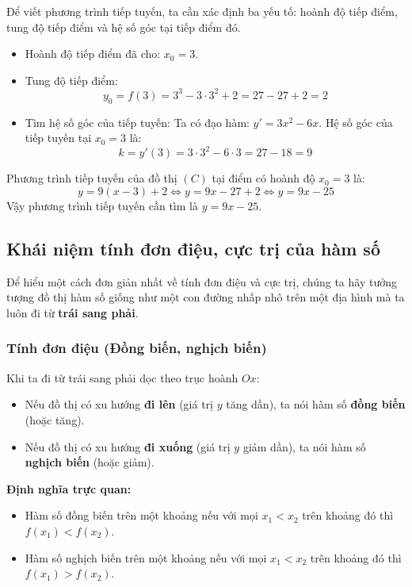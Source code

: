 \documentclass[12pt]{article}
\begin{document}
	\begin{loigiai}
		Để viết phương trình tiếp tuyến, ta cần xác định ba yếu tố: hoành độ tiếp điểm, tung độ tiếp điểm và hệ số góc tại tiếp điểm đó.
		\begin{itemize}
			\item Hoành độ tiếp điểm đã cho: $x_0 = 3$.
			\item Tung độ tiếp điểm:
			$$y_0 = f(3) = 3^3 - 3 \cdot 3^2 + 2 = 27 - 27 + 2 = 2$$
			\item Tìm hệ số góc của tiếp tuyến:
			Ta có đạo hàm: $y' = 3x^2 - 6x$.
			Hệ số góc của tiếp tuyến tại $x_0 = 3$ là:
			$$k = y'(3) = 3 \cdot 3^2 - 6 \cdot 3 = 27 - 18 = 9$$
		\end{itemize}
		Phương trình tiếp tuyến của đồ thị $(C)$ tại điểm có hoành độ $x_0 = 3$ là:
		$$y = 9(x - 3) + 2 \iff y = 9x - 27 + 2 \iff y = 9x - 25$$
		Vậy phương trình tiếp tuyến cần tìm là $y = 9x - 25$.
	\end{loigiai}
	
	
	\subsection{Khái niệm tính đơn điệu, cực trị của hàm số}
	
	Để hiểu một cách đơn giản nhất về tính đơn điệu và cực trị, chúng ta hãy tưởng tượng đồ thị hàm số giống như một con đường nhấp nhô trên một địa hình mà ta luôn đi từ \textbf{trái sang phải}.
	
	\subsubsection{Tính đơn điệu (Đồng biến, nghịch biến)}
	Khi ta đi từ trái sang phải dọc theo trục hoành $Ox$:
	\begin{itemize}
		\item Nếu đồ thị có xu hướng \textbf{đi lên} (giá trị $y$ tăng dần), ta nói hàm số \textbf{đồng biến} (hoặc tăng).
		\item Nếu đồ thị có xu hướng \textbf{đi xuống} (giá trị $y$ giảm dần), ta nói hàm số \textbf{nghịch biến} (hoặc giảm).
	\end{itemize}
	
	\textbf{Định nghĩa trực quan:}
	\begin{itemize}
		\item Hàm số đồng biến trên một khoảng nếu với mọi $x_1 < x_2$ trên khoảng đó thì $f(x_1) < f(x_2)$.
		\item Hàm số nghịch biến trên một khoảng nếu với mọi $x_1 < x_2$ trên khoảng đó thì $f(x_1) > f(x_2)$.
	\end{itemize}
	
\end{document}

